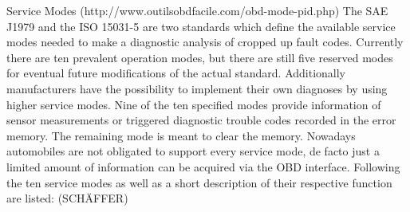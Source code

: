 Service Modes (http://www.outilsobdfacile.com/obd-mode-pid.php)
The SAE J1979 and the ISO 15031-5 are two standards which define the available service modes needed to make a diagnostic analysis of cropped up fault codes. Currently there are ten prevalent operation modes, but there are still five reserved modes for eventual future modifications of the actual standard. Additionally manufacturers have the possibility to implement their own diagnoses by using higher service modes.
Nine of the ten specified modes provide information of sensor measurements or triggered diagnostic trouble codes recorded in the error memory. The remaining mode is meant to clear the memory. Nowadays automobiles are not obligated to support every service  mode, de facto just a limited amount of information can be acquired via the OBD interface.
Following the ten service modes as well as a short description of their respective function are listed: (SCHÄFFER)

